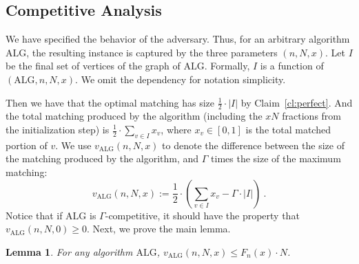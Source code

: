 \documentclass[11pt,letterpaper]{article}
\newtheorem{lemma}{Lemma}[section]
\newcommand{\alg}{\mathrm{ALG}}
\begin{document}
\subsection{Competitive Analysis}
We have specified the behavior of the adversary. Thus, for an arbitrary algorithm $\alg$, the resulting instance is captured by the three parameters $(n,N,x)$.
Let $I$ be the final set of vertices of the graph of $\alg$. Formally, $I$ is a function of $(\alg,n,N,x)$. We omit the dependency for notation simplicity.

Then we have that the optimal matching has size $\frac{1}{2}\cdot |I|$ by Claim~\ref{cl:perfect}.
And the total matching produced by the algorithm (including the $xN$ fractions from the initialization step) is $\frac{1}{2} \cdot \sum_{v \in I} x_v$, where $x_v \in [0,1]$ is the total matched portion of $v$.
We use $v_\alg(n,N,x)$ to denote the difference between the size of the matching produced by the algorithm, and $\Gamma$ times the size of the maximum matching:
\[
v_\alg(n,N,x) := \frac{1}{2} \cdot \left( \sum_{v \in I} x_v - \Gamma \cdot |I| \right)~.
\]
Notice that if $\alg$ is $\Gamma$-competitive, it should have the property that $v_\alg(n,N,0) \ge 0$.
Next, we prove the main lemma.
\begin{lemma}
\label{lem:construction}
For any algorithm $\alg$, $v_\alg(n,N,x) \le F_n(x) \cdot N$.	
\end{lemma}
\end{document}
